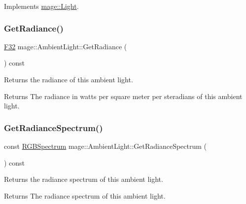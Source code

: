 Implements \hyperlink{classmage_1_1_light_aa613d76a1ebda69efde853d15f75490c}{mage\+::\+Light}.

\hypertarget{classmage_1_1_ambient_light_ab41f72d902f590ebc62ab58427e2bdab}{}\label{classmage_1_1_ambient_light_ab41f72d902f590ebc62ab58427e2bdab} 
\subsubsection{\texorpdfstring{Get\+Radiance()}{GetRadiance()}}
{\footnotesize\ttfamily \hyperlink{namespacemage_aa97e833b45f06d60a0a9c4fc22ae02c0}{F32} mage\+::\+Ambient\+Light\+::\+Get\+Radiance (\begin{DoxyParamCaption}{ }\end{DoxyParamCaption}) const\hspace{0.3cm}{\ttfamily [noexcept]}}

Returns the radiance of this ambient light.

\begin{DoxyReturn}{Returns}
The radiance in watts per square meter per steradians of this ambient light. 
\end{DoxyReturn}
\hypertarget{classmage_1_1_ambient_light_a62c43af9d94835f4a59c3749ecf01e5b}{}\label{classmage_1_1_ambient_light_a62c43af9d94835f4a59c3749ecf01e5b} 
\subsubsection{\texorpdfstring{Get\+Radiance\+Spectrum()}{GetRadianceSpectrum()}}
{\footnotesize\ttfamily const \hyperlink{structmage_1_1_r_g_b_spectrum}{R\+G\+B\+Spectrum} mage\+::\+Ambient\+Light\+::\+Get\+Radiance\+Spectrum (\begin{DoxyParamCaption}{ }\end{DoxyParamCaption}) const\hspace{0.3cm}{\ttfamily [noexcept]}}

Returns the radiance spectrum of this ambient light.

\begin{DoxyReturn}{Returns}
The radiance spectrum of this ambient light. 
\end{DoxyReturn}
\hypertarget{classmage_1_1_ambient_light_aa8bbeaca08a626b6b5f5447a847724cc}{}\label{classmage_1_1_ambient_light_aa8bbeaca08a626b6b5f5447a847724cc} 
